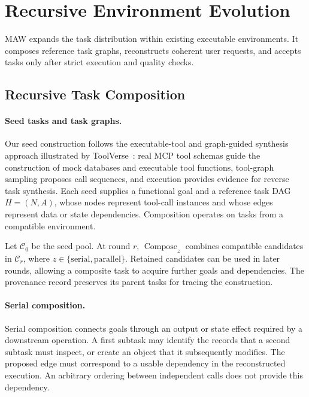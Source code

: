 \section{Recursive Environment Evolution}
\label{sec:evolution}

MAW expands the task distribution within existing executable environments. It composes reference task graphs, reconstructs coherent user requests, and accepts tasks only after strict execution and quality checks. 

\subsection{Recursive Task Composition}
\label{sec:composition}

\paragraph{Seed tasks and task graphs.}
Our seed construction follows the executable-tool and graph-guided synthesis approach illustrated by ToolVerse~\citep{zhou2026toolverse}: real MCP tool schemas guide the construction of mock databases and executable tool functions, tool-graph sampling proposes call sequences, and execution provides evidence for reverse task synthesis. Each seed supplies a functional goal and a reference task DAG $H=(N,A)$, whose nodes represent tool-call instances and whose edges represent data or state dependencies. Composition operates on tasks from a compatible environment.

Let $\mathcal C_0$ be the seed pool. At round $r$, $\operatorname{Compose}_z$ combines compatible candidates in $\mathcal C_r$, where $z\in\{\mathrm{serial},\mathrm{parallel}\}$. Retained candidates can be used in later rounds, allowing a composite task to acquire further goals and dependencies. The provenance record preserves its parent tasks for tracing the construction.

\paragraph{Serial composition.}
Serial composition connects goals through an output or state effect required by a downstream operation. A first subtask may identify the records that a second subtask must inspect, or create an object that it subsequently modifies. The proposed edge must correspond to a usable dependency in the reconstructed execution. An arbitrary ordering between independent calls does not provide this dependency.

